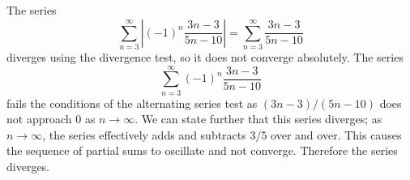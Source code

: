 \documentclass{ximera}
\begin{document}
\begin{question}
\begin{question}
\begin{question}
\begin{prompt}
\begin{selectAll}
        \end{selectAll}
        \begin{feedback}
	  The series
          \[
          \sum_{n=3}^\infty \left|(-1)^n\frac{3n-3}{5n-10}\right| =
          \sum_{n=3}^\infty \frac{3n-3}{5n-10}
          \]
          diverges using the divergence test, so it does not converge
          absolutely.  The series
          \[
          \sum_{n=3}^\infty (-1)^n\frac{3n-3}{5n-10}
          \]
          fails the conditions of the alternating series test as
          $(3n-3)/(5n-10)$ does not approach $0$ as $n\to\infty$. We
          can state further that this series diverges; as
          $n\to\infty$, the series effectively adds and subtracts
          $3/5$ over and over. This causes the sequence of partial
          sums to oscillate and not converge.  Therefore the series
          diverges.
        \end{feedback}
      \end{prompt}
    \end{question}
  \end{question}
\end{question}
\end{document}
